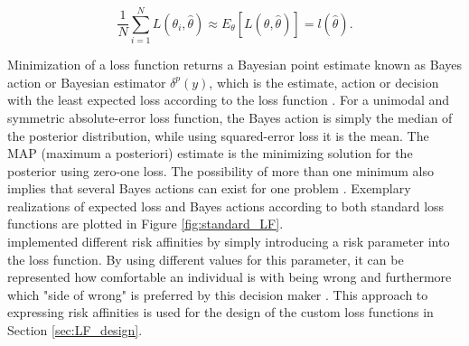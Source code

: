         \begin{equation}\label{eq:ExpectedLoss2}
        \frac{1}{N}\sum_{i=1}^{N} L(\theta_i,\hat{\theta}) \approx E_{\theta}[L(\theta,\hat{\theta})] = l(\hat{\theta}).
        \end{equation}
        
        Minimization of a loss function returns a Bayesian point estimate known as Bayes action or Bayesian estimator $\delta^p(y)$, which is the estimate, action or decision with the least expected loss according to the loss function \citep{berger2013stat, moye2006statistical}. For a unimodal and symmetric absolute-error loss function, the Bayes action is simply the median of the posterior distribution, while using squared-error loss it is the mean. The MAP (maximum a posteriori) estimate is the minimizing solution for the posterior using zero-one loss. The possibility of more than one minimum also implies that several Bayes actions can exist for one problem \citep{davidson2015, berger2013stat}. Exemplary realizations of expected loss and Bayes actions according to both standard loss functions are plotted in Figure \ref{fig:standard_LF}.\\
        \citet{davidson2015} implemented different risk affinities by simply  introducing a risk parameter into the loss function. By using different values for this parameter, it can be represented how comfortable an individual is with being wrong and furthermore which "side of wrong" is preferred by this decision maker \citep{davidson2015}. This approach to expressing risk affinities is used for the design of the custom loss functions in Section \ref{sec:LF_design}.
        
        
